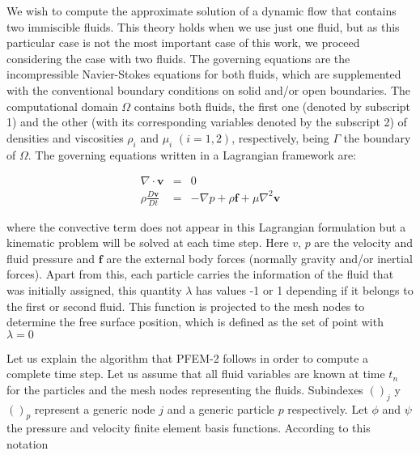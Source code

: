 
We wish to compute the approximate solution of a dynamic flow that contains two immiscible fluids. This theory holds when we use just one fluid, but as this particular case is not the most important case of this work, we proceed considering the case with two fluids. The governing equations are the incompressible Navier-Stokes equations for both fluids, which are supplemented with the conventional boundary conditions on solid and/or open boundaries. The computational domain $\Omega$ contains both fluids, the first one (denoted by subscript 1) and the other (with its corresponding variables denoted by the subscript 2) of densities and viscosities $\rho_i$ and $\mu_i$ $(i=1,2)$, respectively, being $\Gamma$ the boundary of $\Omega$. The governing equations written in a Lagrangian framework are:

\begin{eqnarray}
  \nabla \cdot \mathbf{v} &=& 0 \\
  \rho\frac{D\mathbf{v}}{Dt} &=& -\nabla p + \rho \mathbf{f}+ \mu \nabla^2 \mathbf{v}
\end{eqnarray}

where the convective term does not appear in this Lagrangian formulation but a kinematic problem will be solved at each time step. Here $v$, $p$ are the velocity and fluid pressure and $\mathbf{f}$ are the external body forces (normally gravity and/or inertial forces). Apart from this, each particle carries the information of the fluid that was initially assigned, this quantity $\lambda$ has values -1 or 1 depending if it belongs to the first or second fluid. This function is projected to the mesh nodes to determine the free surface position, which is defined as the set of point with $\lambda=0$

Let us explain the algorithm that PFEM-2 follows in order to compute a complete time step. Let us assume that all fluid variables are known at time $t_n$ for the particles and the mesh nodes representing the fluids. Subindexes $()_j$ y $()_p$ represent a generic node $j$ and a generic particle $p$ respectively. Let $\phi$ and $\psi$ the pressure and velocity finite element basis functions. According to this notation

